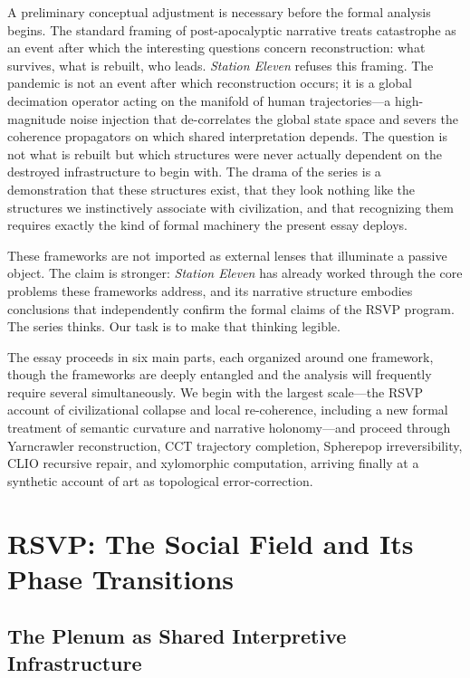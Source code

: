 \documentclass[12pt, oneside]{article}
\theoremstyle{plain}
\theoremstyle{definition}
\theoremstyle{remark}
\begin{document}
A preliminary conceptual adjustment is necessary before the formal
analysis begins. The standard framing of post-apocalyptic narrative
treats catastrophe as an event after which the interesting questions
concern reconstruction: what survives, what is rebuilt, who leads.
\textit{Station Eleven} refuses this framing. The pandemic is not an
event after which reconstruction occurs; it is a global decimation
operator acting on the manifold of human trajectories---a
high-magnitude noise injection that de-correlates the global state
space and severs the coherence propagators on which shared
interpretation depends. The question is not what is rebuilt but
which structures were never actually dependent on the destroyed
infrastructure to begin with. The drama of the series is a
demonstration that these structures exist, that they look nothing
like the structures we instinctively associate with civilization,
and that recognizing them requires exactly the kind of formal
machinery the present essay deploys.

These frameworks are not imported as external lenses that illuminate
a passive object. The claim is stronger: \textit{Station Eleven}
has already worked through the core problems these frameworks
address, and its narrative structure embodies conclusions that
independently confirm the formal claims of the RSVP program. The
series thinks. Our task is to make that thinking legible.

The essay proceeds in six main parts, each organized around one
framework, though the frameworks are deeply entangled and the
analysis will frequently require several simultaneously. We begin
with the largest scale---the RSVP account of civilizational collapse
and local re-coherence, including a new formal treatment of semantic
curvature and narrative holonomy---and proceed through Yarncrawler
reconstruction, CCT trajectory completion, Spherepop irreversibility,
CLIO recursive repair, and xylomorphic computation, arriving finally
at a synthetic account of art as topological error-correction.

\section{RSVP: The Social Field and Its Phase Transitions}

\subsection{The Plenum as Shared Interpretive Infrastructure}
\end{document}
